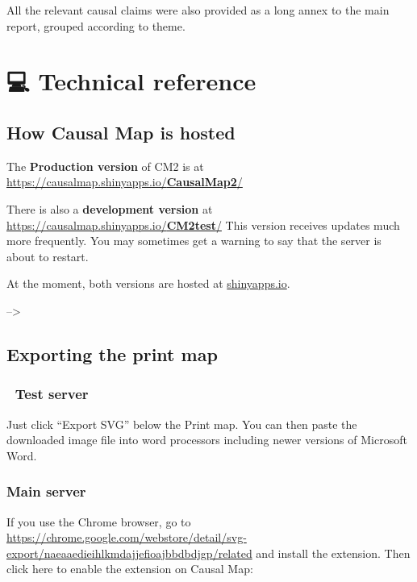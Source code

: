 \documentclass[
]{book}
\begin{document}
All the relevant causal claims were also provided as a long annex to the main report, grouped according to theme.

\hypertarget{part-technical-reference}{%
\part{💻 Technical reference}\label{part-technical-reference}}

\hypertarget{how-causal-map-is-hosted}{%
\chapter{How Causal Map is hosted}\label{how-causal-map-is-hosted}}

The \textbf{Production version} of CM2 is at \href{https://causalmap.shinyapps.io/CausalMap2/}{https://causalmap.shinyapps.io/\textbf{CausalMap2}/}

There is also a \textbf{development version} at \href{https://causalmap.shinyapps.io/CM2test/}{https://causalmap.shinyapps.io/\textbf{CM2test}/} This version receives updates much more frequently. You may sometimes get a warning to say that the server is about to restart.

At the moment, both versions are hosted at \href{http://shinyapps.io}{shinyapps.io}.

--\textgreater{}

\hypertarget{exporting-the-print-map}{%
\chapter{Exporting the print map}\label{exporting-the-print-map}}

\hypertarget{test-server}{%
\section{🧪 Test server}\label{test-server}}

Just click ``Export SVG'' below the Print map. You can then paste the downloaded image file into word processors including newer versions of Microsoft Word.

\hypertarget{main-server}{%
\section{Main server}\label{main-server}}

If you use the Chrome browser, go to \url{https://chrome.google.com/webstore/detail/svg-export/naeaaedieihlkmdajjefioajbbdbdjgp/related} and install the extension. Then click here to enable the extension on Causal Map:
\end{document}
